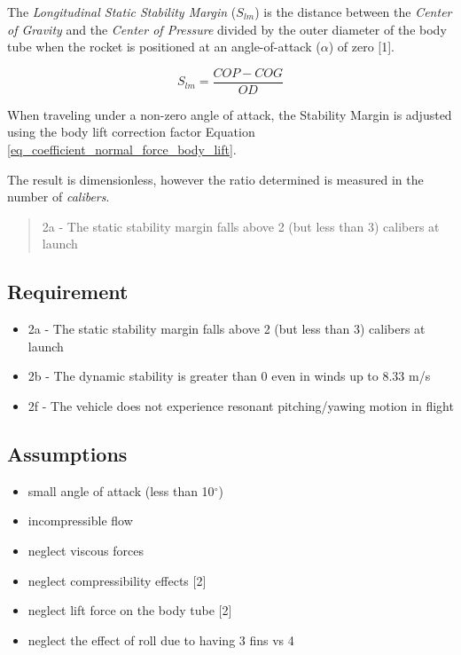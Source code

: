 \documentclass[]{article}
\providecommand{\tightlist}{%
  \setlength{\itemsep}{0pt}\setlength{\parskip}{0pt}}
\begin{document}
The \emph{Longitudinal Static Stability Margin} (\(S_{lm}\)) is the
distance between the \emph{Center of Gravity} and the \emph{Center of
Pressure} divided by the outer diameter of the body tube when the rocket
is positioned at an angle-of-attack (\(\alpha\)) of zero {[}1{]}.

\[ S_{lm} = \dfrac{COP - COG}{OD} \]

When traveling under a non-zero angle of attack, the Stability Margin is
adjusted using the body lift correction factor Equation
\ref{eq_coefficient_normal_force_body_lift}.

The result is dimensionless, however the ratio determined is measured in
the number of \emph{calibers}.

\begin{quote}
2a - The static stability margin falls above 2 (but less than 3)
calibers at launch
\end{quote}

\subsection{Requirement}\label{requirement}

\begin{itemize}
\tightlist
\item
  2a - The static stability margin falls above 2 (but less than 3)
  calibers at launch
\item
  2b - The dynamic stability is greater than 0 even in winds up to 8.33
  m/s
\item
  2f - The vehicle does not experience resonant pitching/yawing motion
  in flight
\end{itemize}

\subsection{Assumptions}\label{assumptions}

\begin{itemize}
\tightlist
\item
  small angle of attack (less than 10\(^\circ\))
\item
  incompressible flow
\item
  neglect viscous forces
\item
  neglect compressibility effects {[}2{]}
\item
  neglect lift force on the body tube {[}2{]}
\item
  neglect the effect of roll due to having 3 fins vs 4
\end{itemize}
\end{document}
